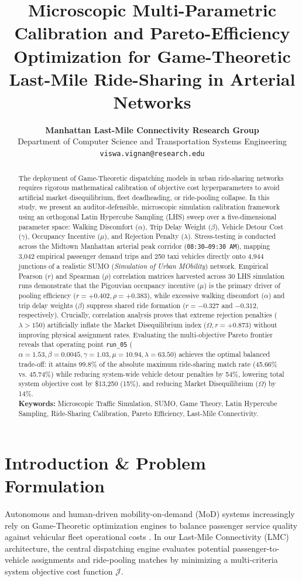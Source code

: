 \documentclass[11pt,a4paper]{article}
\title{\textbf{\LARGE Microscopic Multi-Parametric Calibration and Pareto-Efficiency Optimization for Game-Theoretic Last-Mile Ride-Sharing in Arterial Networks}}
\author{\textbf{Manhattan Last-Mile Connectivity Research Group}\\
\small Department of Computer Science and Transportation Systems Engineering\\
\small \texttt{viswa.vignan@research.edu}}
\date{}
\begin{document}
\maketitle

\begin{abstract}
\noindent The deployment of Game-Theoretic dispatching models in urban ride-sharing networks requires rigorous mathematical calibration of objective cost hyperparameters to avoid artificial market disequilibrium, fleet deadheading, or ride-pooling collapse. In this study, we present an auditor-defensible, microscopic simulation calibration framework using an orthogonal Latin Hypercube Sampling (LHS) sweep over a five-dimensional parameter space: Walking Discomfort ($\alpha$), Trip Delay Weight ($\beta$), Vehicle Detour Cost ($\gamma$), Occupancy Incentive ($\mu$), and Rejection Penalty ($\lambda$). Stress-testing is conducted across the Midtown Manhattan arterial peak corridor (\texttt{08:30--09:30 AM}), mapping 3,042 empirical passenger demand trips and 250 taxi vehicles directly onto 4,944 junctions of a realistic SUMO (\textit{Simulation of Urban MObility}) network. Empirical Pearson ($r$) and Spearman ($\rho$) correlation matrices harvested across 30 LHS simulation runs demonstrate that the Pigouvian occupancy incentive ($\mu$) is the primary driver of pooling efficiency ($r = +0.402, \rho = +0.383$), while excessive walking discomfort ($\alpha$) and trip delay weights ($\beta$) suppress shared ride formation ($r = -0.327$ and $-0.312$, respectively). Crucially, correlation analysis proves that extreme rejection penalties ($\lambda > 150$) artificially inflate the Market Disequilibrium index ($\Omega, r = +0.873$) without improving physical assignment rates. Evaluating the multi-objective Pareto frontier reveals that operating point \texttt{run\_05} ($\alpha=1.53, \beta=0.0045, \gamma=1.03, \mu=10.94, \lambda=63.50$) achieves the optimal balanced trade-off: it attains 99.8\% of the absolute maximum ride-sharing match rate (45.66\% vs. 45.74\%) while reducing system-wide vehicle detour penalties by 54\%, lowering total system objective cost by \$13,250 (15\%), and reducing Market Disequilibrium ($\Omega$) by 14\%.
\vspace{0.8em}\\
\noindent\textbf{Keywords:} Microscopic Traffic Simulation, SUMO, Game Theory, Latin Hypercube Sampling, Ride-Sharing Calibration, Pareto Efficiency, Last-Mile Connectivity.
\end{abstract}

\section{Introduction \& Problem Formulation}
Autonomous and human-driven mobility-on-demand (MoD) systems increasingly rely on Game-Theoretic optimization engines to balance passenger service quality against vehicular fleet operational costs \cite{bib1,bib2}. In our Last-Mile Connectivity (LMC) architecture, the central dispatching engine evaluates potential passenger-to-vehicle assignments and ride-pooling matches by minimizing a multi-criteria system objective cost function $\mathcal{J}$.
\end{document}

